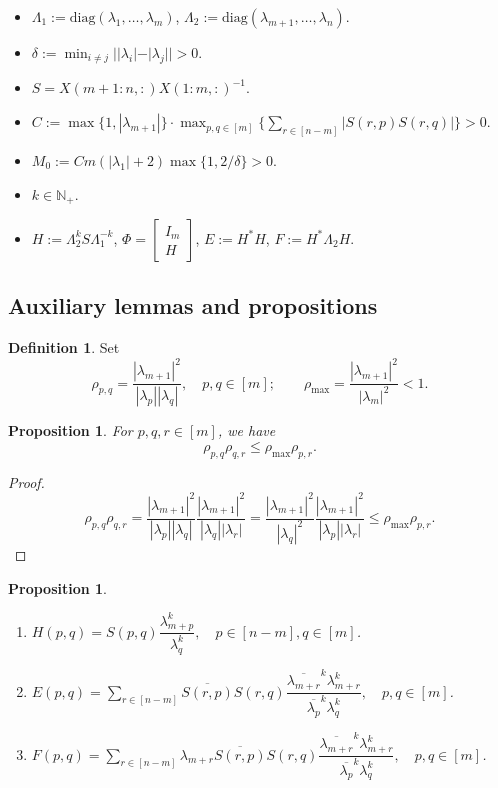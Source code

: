 \documentclass[11pt,a4paper]{article}
\theoremstyle{plain}              %
\newtheorem{proposition}[theorem]{Proposition}
\theoremstyle{definition}         %
\newtheorem{definition}[theorem]{Definition}
\begin{document}
\begin{itemize}
\item \(\Lambda_1:=\mathrm{diag}(\lambda_1,\dots,\lambda_m)\), \(\Lambda_2:=\mathrm{diag}(\lambda_{m+1},\dots,\lambda_n)\).
\item \(\delta:=\min_{i\neq j}||\lambda_i|-|\lambda_j||>0\).
\item \(S=X(m+1:n,:)X(1:m,:)^{-1}\).
\item \(C:=\max\{1,|\lambda_{m+1}|\}\cdot\max_{p,q\in[m]}\{\sum_{r\in[n-m]}|S(r,p)S(r,q)|\}>0\).
\item \(M_0:=Cm(|\lambda_1|+2)\max\{1,2/\delta\}>0\).
\item \(k\in\mathbb{N}_+\).
\item \(H:=\Lambda_2^kS\Lambda_1^{-k}\), \(\Phi=\begin{bmatrix}
I_m\\
H
\end{bmatrix}\), \(E:=H^* H\), \(F:=H^*\Lambda_2H\).
\end{itemize}

\subsection{Auxiliary lemmas and propositions}

\begin{definition}
Set
\[
\rho_{p,q}=\dfrac{|\lambda_{m+1}|^2}{|\lambda_p||\lambda_q|},\quad p,q\in[m];\qquad\rho_{\max}=\dfrac{|\lambda_{m+1}|^2}{|\lambda_m|^2}<1.
\]
\end{definition}

\begin{proposition}
For \(p,q,r\in[m]\), we have
\[
\rho_{p,q}\rho_{q,r}\leq\rho_{\max}\rho_{p,r}.
\]
\end{proposition}
\begin{proof}
\[
\rho_{p,q}\rho_{q,r}=\dfrac{|\lambda_{m+1}|^2}{|\lambda_p||\lambda_q|}\dfrac{|\lambda_{m+1}|^2}{|\lambda_q||\lambda_r|}=\dfrac{|\lambda_{m+1}|^2}{|\lambda_q|^2}\dfrac{|\lambda_{m+1}|^2}{|\lambda_p||\lambda_r|}\leq\rho_{\max}\rho_{p,r}.
\]
\end{proof}

\begin{proposition}
\begin{enumerate}
\item \(H(p,q)=S(p,q)\dfrac{\lambda_{m+p}^k}{\lambda_{q}^k},\quad p\in[n-m],q\in[m]\).
\item \(E(p,q)=\sum_{r\in[n-m]}\overline{S(r,p)}S(r,q)\dfrac{\overline{\lambda_{m+r}}^k\lambda_{m+r}^k}{\overline{\lambda_p}^{k}\lambda_q^k},\quad p,q\in[m]\).
\item \(F(p,q)=\sum_{r\in[n-m]}\lambda_{m+r}\overline{S(r,p)}S(r,q)\dfrac{\overline{\lambda_{m+r}}^k\lambda_{m+r}^k}{\overline{\lambda_p}^{k}\lambda_q^k},\quad p,q\in[m]\).
\end{enumerate}
\end{proposition}
\end{document}
